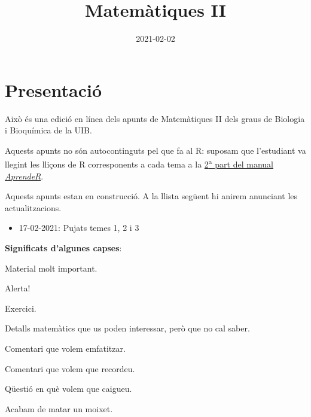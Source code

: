 \documentclass[
]{book}
\title{Matemàtiques II}
\author{}
\date{\vspace{-2.5em}2021-02-02}
\providecommand{\tightlist}{%
  \setlength{\itemsep}{0pt}\setlength{\parskip}{0pt}}
\renewcommand\chaptername{Tema}}
\renewcommand\chaptername{Tema}
\renewcommand{\leq}{\leqslant}
\renewcommand{\geq}{\geqslant}
\newenvironment{rmdblock}[1]
  {
  \begin{itemize}
  \renewcommand{\labelitemi}{
    \raisebox{-.7\height}[0pt][0pt]{
      {\setkeys{Gin}{width=3em,keepaspectratio}\texttt{[image: Bioestadística-II\_files/figure-html/\#1]}}
    }
  }
  \setlength{\fboxsep}{1em}
  \begin{kframe}
  \item
  }
  {
  \end{kframe}
  \end{itemize}
  }
\newenvironment{rmdnote}
  {\begin{rmdblock}{note}}
  {\end{rmdblock}}
\newenvironment{rmdcaution}
  {\begin{rmdblock}{caution}}
  {\end{rmdblock}}
\newenvironment{rmdimportant}
  {\begin{rmdblock}{important}}
  {\end{rmdblock}}
\newenvironment{rmdcorbes}
  {\begin{rmdblock}{corbes}}
  {\end{rmdblock}}
\theoremstyle{definition}
\theoremstyle{definition}
\theoremstyle{definition}
\theoremstyle{remark}
\begin{document}
\maketitle

{
\setcounter{tocdepth}{1}
\tableofcontents
}
\renewcommand\chaptername{Tema}
\renewcommand{\leq}{\leqslant}
\renewcommand{\geq}{\geqslant}

\hypertarget{presentaciuxf3}{%
\chapter*{Presentació}\label{presentaciuxf3}}

Això és una edició en línea dels apunts de Matemàtiques II dels graus de Biologia i Bioquímica de la UIB.

Aquests apunts no són autocontinguts pel que fa al R: suposam que l'estudiant va llegint les lliçons de R corresponents a cada tema a la \href{https://aprender-uib.github.io/AprendeR2/}{2\textsuperscript{a} part del manual \emph{AprendeR}}.

Aquests apunts estan en construcció. A la llista següent hi anirem anunciant les actualitzacions.

\begin{itemize}
\tightlist
\item
  17-02-2021: Pujats temes 1, 2 i 3
\end{itemize}

\textbf{Significats d'algunes capses}:

\begin{rmdimportant}
Material molt important.
\end{rmdimportant}
\begin{rmdcaution}
Alerta!
\end{rmdcaution}
\begin{rmdexercici}
Exercici.
\end{rmdexercici}
\begin{rmdcorbes}
Detalls matemàtics que us poden interessar, però que no cal saber.
\end{rmdcorbes}
\begin{rmdnote}
Comentari que volem emfatitzar.
\end{rmdnote}
\begin{rmdrecordau}
Comentari que volem que recordeu.
\end{rmdrecordau}
\begin{rmdromans}
Qüestió en què volem que caigueu.
\end{rmdromans}
\begin{rmderrorpetit}
Acabam de matar un moixet.
\end{rmderrorpetit}
\end{document}
